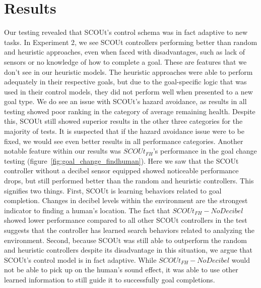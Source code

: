\section{Results}
Our testing revealed that SCOUt's control schema was in fact adaptive to new tasks.
In Experiment 2, we see SCOUt controllers performing better than random and heuristic approaches, even when faced with disadvantages, such as lack of sensors or no knowledge of how to complete a goal.
These are features that we don't see in our heuristic models.
The heuristic approaches were able to perform adequately in their respective goals, but due to the goal-specific logic that was used in their control models, they did not perform well when presented to a new goal type.
We do see an issue with SCOUt's hazard avoidance, as results in all testing showed poor ranking in the category of average remaining health.
Despite this, SCOUt still showed superior results in the other three categories for the majority of tests.
It is suspected that if the hazard avoidance issue were to be fixed, we would see even better results in all performance categories.
Another notable feature within our results was $SCOUt_{FH}$'s performance in the goal change testing (figure~\ref{fig:goal_change_findhuman}).
Here we saw that the SCOUt controller without a decibel sensor equipped showed noticeable performance drops, but still performed better than the random and heuristic controllers.
This signifies two things.
First, SCOUt is learning behaviors related to goal completion.
Changes in decibel levels within the environment are the strongest indicator to finding a human's location.
The fact that $SCOUt_{FH} - No Decibel$ showed lower performance compared to all other SCOUt controllers in the test suggests that the controller has learned search behaviors related to analyzing the environment.
Second, because SCOUt was still able to outperform the random and heuristic controllers despite its disadvantage in this situation, we argue that SCOUt's control model is in fact adaptive.
While $SCOUt_{FH} - No Decibel$ would not be able to pick up on the human's sound effect, it was able to use other learned information to still guide it to successfully goal completions.
